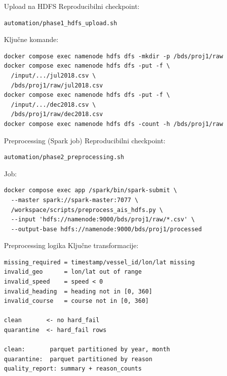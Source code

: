 \documentclass[aspectratio=169,11pt]{beamer}
\begin{document}
\begin{frame}[fragile]{Upload na HDFS}
  Reproducibilni checkpoint:
  \begin{verbatim}
automation/phase1_hdfs_upload.sh
  \end{verbatim}

  Ključne komande:
  \scriptsize
  \begin{verbatim}
docker compose exec namenode hdfs dfs -mkdir -p /bds/proj1/raw
docker compose exec namenode hdfs dfs -put -f \
  /input/.../jul2018.csv \
  /bds/proj1/raw/jul2018.csv
docker compose exec namenode hdfs dfs -put -f \
  /input/.../dec2018.csv \
  /bds/proj1/raw/dec2018.csv
docker compose exec namenode hdfs dfs -count -h /bds/proj1/raw
  \end{verbatim}
  \normalsize
\end{frame}

\begin{frame}[fragile]{Preprocessing (Spark job)}
  Reproducibilni checkpoint:
  \begin{verbatim}
automation/phase2_preprocessing.sh
  \end{verbatim}

  Job:
  \begin{verbatim}
docker compose exec app /spark/bin/spark-submit \
  --master spark://spark-master:7077 \
  /workspace/scripts/preprocess_ais_hdfs.py \
  --input 'hdfs://namenode:9000/bds/proj1/raw/*.csv' \
  --output-base hdfs://namenode:9000/bds/proj1/processed
  \end{verbatim}
\end{frame}

\begin{frame}[fragile]{Preprocessing logika}
  Ključne transformacije:
  \begin{verbatim}
missing_required = timestamp/vessel_id/lon/lat missing
invalid_geo      = lon/lat out of range
invalid_speed    = speed < 0
invalid_heading  = heading not in [0, 360]
invalid_course   = course not in [0, 360]

clean       <- no hard_fail
quarantine  <- hard_fail rows

clean:       parquet partitioned by year, month
quarantine:  parquet partitioned by reason
quality_report: summary + reason_counts
  \end{verbatim}
\end{frame}
\end{document}
